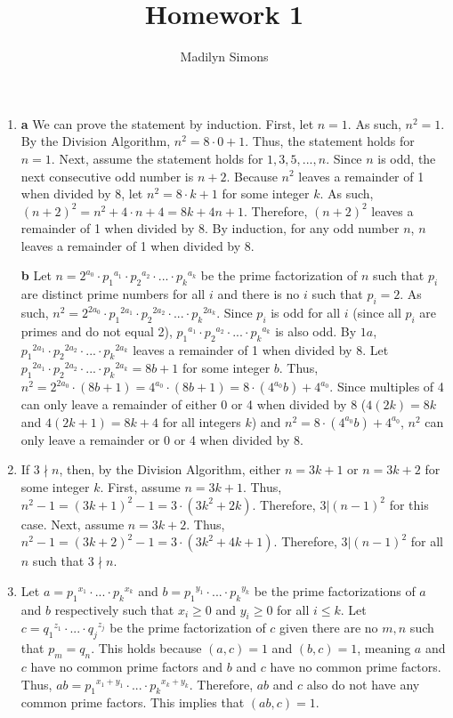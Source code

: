 \documentclass{article}
\title{Homework 1}
\author{Madilyn Simons}
\date{}
\begin{document}
\maketitle

\begin{enumerate}

\item \textbf{a} We can prove the statement by induction.  First, let $n = 1$.
As such, $n^2 = 1$.  By the Division Algorithm, $n^2 = 8\cdot 0 + 1$.  Thus, the
statement holds for $n = 1$.  Next, assume the statement holds for $1, 3, 5, ..., n$.
  Since $n$ is odd, the next consecutive odd number is $n+2$.  Because $n^2$
  leaves a remainder of 1 when divided by 8, let $n^2 = 8\cdot k + 1$ for some integer $k$.
  As such, $(n+2)^2 = n^2 + 4\cdot n + 4 = 8k + 4n + 1$.
  Therefore, $(n+2)^2$ leaves a remainder of 1 when divided by 8.  By induction,
  for any odd number $n$, $n$ leaves a remainder of 1 when divided by 8.

\textbf{b} Let $n = 2^{a_0} \cdot  {p_1}^{a_1} \cdot  {p_2}^{a_2} \cdot  ... \cdot  {p_k}^{a_k}$
be the prime factorization of $n$ such that $p_i$ are distinct prime numbers for
all $i$ and there is no $i$ such that $p_i = 2$.
As such, $n^2 = 2^{2a_0} \cdot  {p_1}^{2a_1} \cdot  {p_2}^{2a_2} \cdot  ... \cdot  {p_k}^{2a_k}$.
Since $p_i$ is odd for all $i$ (since all $p_i$ are primes and do not equal 2),
${p_1}^{a_1} \cdot  {p_2}^{a_2} \cdot  ... \cdot  {p_k}^{a_k}$ is also odd.
By $1a$, ${p_1}^{2a_1} \cdot  {p_2}^{2a_2} \cdot  ... \cdot  {p_k}^{2a_k}$ leaves
a remainder of 1 when divided by 8.  Let ${p_1}^{2a_1} \cdot  {p_2}^{2a_2} \cdot  ... \cdot  {p_k}^{2a_k} = 8b + 1$
for some integer $b$.  Thus, $n^2 = 2^{2a_0} \cdot  (8b + 1) = 4^{a_0} \cdot  (8b + 1) = 8 \cdot  (4^{a_0}b) + 4^{a_0}.$
Since multiples of 4 can only leave a remainder of either 0 or 4 when divided by 8
($4(2k) = 8k$ and $4(2k + 1) = 8k + 4$ for all integers $k$)
and $n^2 = 8 \cdot  (4^{a_0}b) + 4^{a_0}$, $n^2$ can only leave a remainder or 0 or 4
when divided by 8.

\item If $3 \nmid n$, then, by the Division Algorithm, either $n = 3k + 1$ or $n = 3k + 2$ for some integer $k$.  First, assume $n = 3k + 1$.  Thus, $n^2 - 1 = (3k + 1)^2 - 1 = 3 \cdot  (3k^2 + 2k)$.  Therefore, $3 \vert (n - 1)^2$ for this case.  Next, assume $n = 3k + 2$.  Thus, $n^2 - 1 = (3k + 2)^2 - 1 = 3 \cdot  (3k^2 + 4k + 1)$.  Therefore, $3 \vert (n - 1)^2$ for all $n$ such that $3 \nmid n$.

\item Let $a = {p_1}^{x_1} \cdot  ... \cdot  {p_k}^{x_k}$ and $b = {p_1}^{y_1} \cdot  ... \cdot  {p_k}^{y_k}$ be the prime factorizations of $a$ and $b$ respectively such that $x_i \geq 0$ and $y_i \geq 0$ for all $i \leq k$.  Let $c = {q_1}^{z_1} \cdot  ... \cdot  {q_j}^{z_j}$ be the prime factorization of $c$ given there are no $m, n$ such that $p_m = q_n$.  This holds because $(a, c) = 1$ and $(b, c) = 1$, meaning $a$ and $c$ have no common prime factors and $b$ and $c$ have no common prime factors.  Thus, $ab = {p_1}^{x_1 + y_1} \cdot  ... \cdot  {p_k}^{x_k + y_k}$.  Therefore, $ab$ and $c$ also do not have any common prime factors.  This implies that $(ab, c) = 1$.


\end{enumerate}
\end{document}
